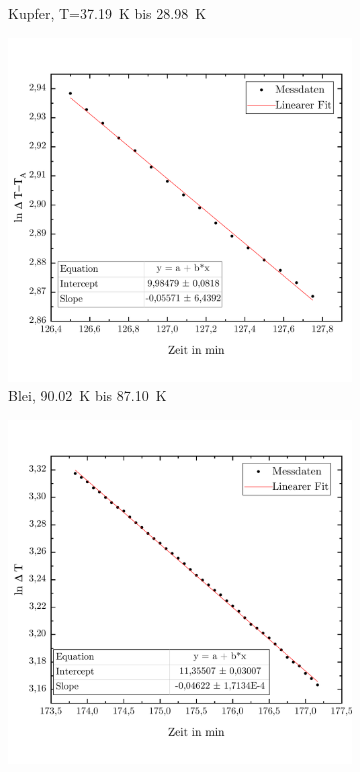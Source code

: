 \documentclass[parskip=half, a4paper,twoside,final]{article}
\begin{document}
\begin{figure}[ht!]
\begin{subfigure}[b!]{0.45\textwidth}
    \caption{Kupfer, T=\SI{37,19}{\kelvin} bis \SI{28,98}{\kelvin}}
  \end{subfigure}
  \begin{subfigure}[b!]{0.45\textwidth}
    \includegraphics[width=\textwidth]{Bilder/90_02__87_10_lnDetlaT_TA}
    \caption{Blei, \SI{90,02}{\kelvin} bis \SI{87,10}{\kelvin}}
  \end{subfigure}
  \begin{subfigure}[b!]{0.45\textwidth}
    \includegraphics[width=\textwidth]{Bilder/41_71__37_06_lnT.pdf}

\end{subfigure}
\end{figure}
\end{document}
